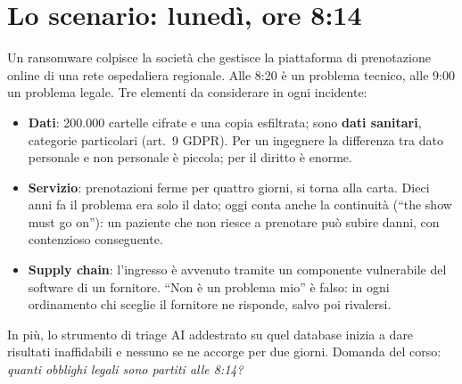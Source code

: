 \section{Lo scenario: lunedì, ore 8:14}
Un ransomware colpisce la società che gestisce la piattaforma di prenotazione online di una rete
ospedaliera regionale. Alle 8:20 è un problema tecnico, alle 9:00 un problema legale. Tre elementi da
considerare in ogni incidente:
\begin{itemize}
  \item \textbf{Dati}: 200.000 cartelle cifrate e una copia esfiltrata; sono \textbf{dati sanitari},
    categorie particolari (art.~9 GDPR). Per un ingegnere la differenza tra dato personale e non
    personale è piccola; per il diritto è enorme.
  \item \textbf{Servizio}: prenotazioni ferme per quattro giorni, si torna alla carta. Dieci anni fa il
    problema era solo il dato; oggi conta anche la continuità (``the show must go on''): un paziente
    che non riesce a prenotare può subire danni, con contenzioso conseguente.
  \item \textbf{Supply chain}: l'ingresso è avvenuto tramite un componente vulnerabile del software
    di un fornitore. ``Non è un problema mio'' è falso: in ogni ordinamento chi sceglie il fornitore ne
    risponde, salvo poi rivalersi.
\end{itemize}
In più, lo strumento di triage AI addestrato su quel database inizia a dare risultati inaffidabili e
nessuno se ne accorge per due giorni. Domanda del corso: \emph{quanti obblighi legali sono partiti
alle 8:14?}

